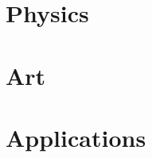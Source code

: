 \documentclass{book}
\begin{document}
\chapter{Physics}


\chapter{Art}



%


\chapter{Applications}











%

\end{document}
